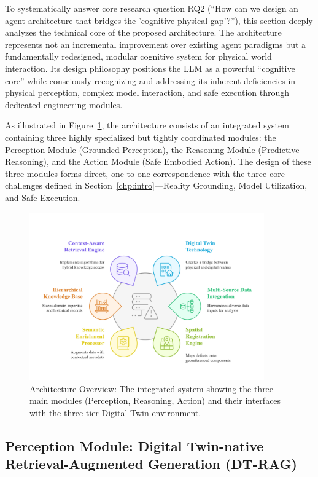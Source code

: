 To systematically answer core research question RQ2 (``How can we design an agent architecture that bridges the 'cognitive-physical gap'?''), this section deeply analyzes the technical core of the proposed architecture. The architecture represents not an incremental improvement over existing agent paradigms but a fundamentally redesigned, modular cognitive system for physical world interaction. Its design philosophy positions the LLM as a powerful ``cognitive core'' while consciously recognizing and addressing its inherent deficiencies in physical perception, complex model interaction, and safe execution through dedicated engineering modules.

As illustrated in Figure~\ref{fig:architecture_overview}, the architecture consists of an integrated system containing three highly specialized but tightly coordinated modules: the Perception Module (Grounded Perception), the Reasoning Module (Predictive Reasoning), and the Action Module (Safe Embodied Action). The design of these three modules forms direct, one-to-one correspondence with the three core challenges defined in Section~\ref{chp:intro}—Reality Grounding, Model Utilization, and Safe Execution.

\begin{figure}[htbp]
\centering
\includegraphics[width=0.9\textwidth]{figures/DefectGPT/Overall Framework.png}
\caption{Architecture Overview: The integrated system showing the three main modules (Perception, Reasoning, Action) and their interfaces with the three-tier Digital Twin environment.}
\label{fig:architecture_overview}
\end{figure}

\subsection{Perception Module: Digital Twin-native Retrieval-Augmented Generation (DT-RAG)}

